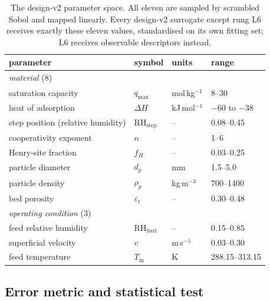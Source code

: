 \begin{table}[t]
\centering
\caption{The design-v2 parameter space. All eleven are sampled by scrambled Sobol and
mapped linearly. Every design-v2 surrogate except rung L6 receives exactly these eleven
values, standardised on its own fitting set; L6 receives observable descriptors instead.}
\label{tab:params}
\begin{tabular}{llll}
\toprule
parameter & symbol & units & range \\
\midrule
\multicolumn{4}{l}{\emph{material} (8)} \\
saturation capacity & \(q_{\max}\) & mol\,kg\(^{-1}\) & 8--30 \\
heat of adsorption & \(\Delta H\) & kJ\,mol\(^{-1}\) & \(-60\) to \(-38\) \\
step position (relative humidity) & \(\mathrm{RH}_{\mathrm{step}}\) & -- & 0.08--0.45 \\
cooperativity exponent & \(n\) & -- & 1--6 \\
Henry-site fraction & \(f_H\) & -- & 0.03--0.25 \\
particle diameter & \(d_p\) & mm & 1.5--5.0 \\
particle density & \(\rho_p\) & kg\,m\(^{-3}\) & 700--1400 \\
bed porosity & \(\varepsilon_t\) & -- & 0.30--0.48 \\
\midrule
\multicolumn{4}{l}{\emph{operating condition} (3)} \\
feed relative humidity & \(\mathrm{RH}_{\mathrm{feed}}\) & -- & 0.15--0.85 \\
superficial velocity & \(v\) & m\,s\(^{-1}\) & 0.03--0.30 \\
feed temperature & \(T_{\mathrm{in}}\) & K & 288.15--313.15 \\
\bottomrule
\end{tabular}
\end{table}

\subsection*{Error metric and statistical test}

